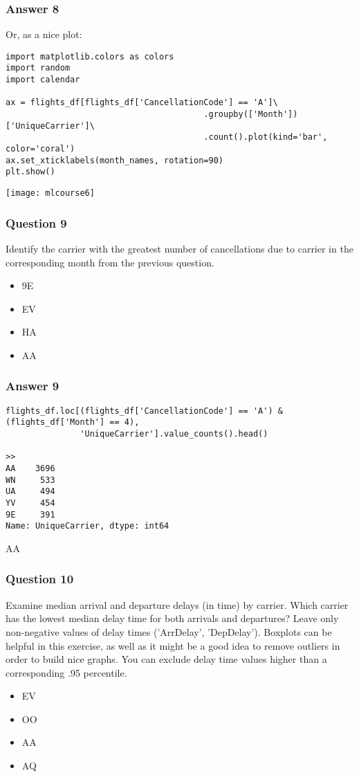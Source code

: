 \begin{frame}[fragile]\frametitle{Answer 8}
Or, as a nice plot:
\begin{lstlisting}
import matplotlib.colors as colors
import random 
import calendar

ax = flights_df[flights_df['CancellationCode'] == 'A']\
                                        .groupby(['Month'])['UniqueCarrier']\
                                        .count().plot(kind='bar', color='coral')
ax.set_xticklabels(month_names, rotation=90)
plt.show()
\end{lstlisting}
\begin{center}
\texttt{[image: mlcourse6]}
\end{center}
\end{frame}
\begin{frame}[fragile]\frametitle{Question 9}
 Identify the carrier with the greatest number of cancellations due to carrier in the corresponding month from the previous question.
 \begin{itemize}
\item 9E
\item EV
\item HA
\item AA
\end{itemize}

\end{frame}

\begin{frame}[fragile]\frametitle{Answer 9}
\begin{lstlisting}
flights_df.loc[(flights_df['CancellationCode'] == 'A') & (flights_df['Month'] == 4),
               'UniqueCarrier'].value_counts().head()
			   
>>
AA    3696
WN     533
UA     494
YV     454
9E     391
Name: UniqueCarrier, dtype: int64			   
\end{lstlisting}
AA
\end{frame}


\begin{frame}[fragile]\frametitle{Question 10}
Examine median arrival and departure delays (in time) by carrier. Which carrier has the lowest median delay time for both arrivals and departures? Leave only non-negative values of delay times ('ArrDelay', 'DepDelay'). Boxplots can be helpful in this exercise, as well as it might be a good idea to remove outliers in order to build nice graphs. You can exclude delay time values higher than a corresponding .95 percentile.
 \begin{itemize}
\item EV
\item OO
\item AA
\item AQ
\end{itemize}

\end{frame}

